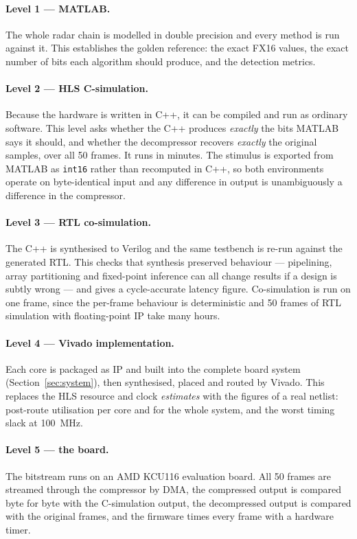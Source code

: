 \paragraph{Level 1 --- MATLAB.}
The whole radar chain is modelled in double precision and every method is run
against it. This establishes the golden reference: the exact FX16 values, the
exact number of bits each algorithm should produce, and the detection metrics.

\paragraph{Level 2 --- HLS C-simulation.}
Because the hardware is written in C++, it can be compiled and run as ordinary
software. This level asks whether the C++ produces \emph{exactly} the bits
MATLAB says it should, and whether the decompressor recovers \emph{exactly} the
original samples, over all 50 frames. It runs in minutes. The stimulus is
exported from MATLAB as \texttt{int16} rather than recomputed in C++, so both
environments operate on byte-identical input and any difference in output is
unambiguously a difference in the compressor.

\paragraph{Level 3 --- RTL co-simulation.}
The C++ is synthesised to Verilog and the same testbench is re-run against the
generated RTL. This checks that synthesis preserved behaviour --- pipelining,
array partitioning and fixed-point inference can all change results if a
design is subtly wrong --- and gives a cycle-accurate latency figure.
Co-simulation is run on one frame, since the per-frame behaviour is
deterministic and 50 frames of RTL simulation with floating-point IP take many
hours.

\paragraph{Level 4 --- Vivado implementation.}
Each core is packaged as IP and built into the complete board system
(Section~\ref{sec:system}), then synthesised, placed and routed by Vivado. This
replaces the HLS resource and clock \emph{estimates} with the figures of a real
netlist: post-route utilisation per core and for the whole system, and the
worst timing slack at \SI{100}{\mega\hertz}.

\paragraph{Level 5 --- the board.}
The bitstream runs on an AMD KCU116 evaluation board. All 50 frames are
streamed through the compressor by DMA, the compressed output is compared byte
for byte with the C-simulation output, the decompressed output is compared with
the original frames, and the firmware times every frame with a hardware timer.


